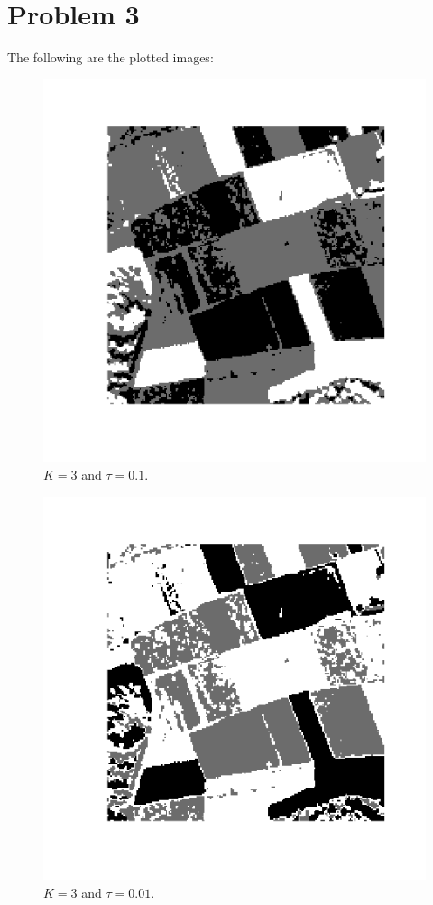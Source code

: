 \documentclass[twoside]{Homework}
\begin{document}
\section*{Problem 3}
The following are the plotted images:
\begin{figure}[!ht]
  \centering
    \includegraphics[scale=0.6]{3-01.png}
  \caption{$K=3$ and $\tau=0.1$.}
\end{figure}
\begin{figure}[!ht]
  \centering
    \includegraphics[scale=0.6]{3-001.png}
  \caption{$K=3$ and $\tau=0.01$.}
\end{figure}
\end{document}
